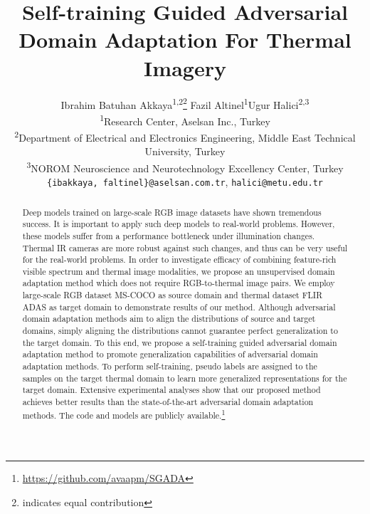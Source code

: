 \documentclass[final]{cvpr}
\begin{document}
\title{\vspace{-10mm}Self-training Guided Adversarial Domain Adaptation For Thermal Imagery}

\author{Ibrahim Batuhan Akkaya\textsuperscript{1,2}\thanks{indicates equal contribution} \qquad\qquad Fazil Altinel\textsuperscript{1}\footnotemark[1] \qquad\qquad Ugur Halici\textsuperscript{2,3}\\
\textsuperscript{1}Research Center, Aselsan Inc., Turkey\\
\textsuperscript{2}Department of Electrical and Electronics Engineering, Middle East Technical University, Turkey\\
\textsuperscript{3}NOROM Neuroscience and Neurotechnology Excellency Center, Turkey\\
{\tt\small \{ibakkaya, faltinel\}@aselsan.com.tr}, {\tt\small halici@metu.edu.tr}
}

\maketitle


\begin{abstract}
Deep models trained on large-scale RGB image datasets have shown tremendous success. It is important to apply such deep models to real-world problems. However, these models suffer from a performance bottleneck under illumination changes. Thermal IR cameras are more robust against such changes, and thus can be very useful for the real-world problems. In order to investigate efficacy of combining feature-rich visible spectrum and thermal image modalities, we propose an unsupervised domain adaptation method which does not require RGB-to-thermal image pairs. We employ large-scale RGB dataset MS-COCO as source domain and thermal dataset FLIR ADAS as target domain to demonstrate results of our method. Although adversarial domain adaptation methods aim to align the distributions of source and target domains, simply aligning the distributions cannot guarantee perfect generalization to the target domain. To this end, we propose a self-training guided adversarial domain adaptation method to promote generalization capabilities of adversarial domain adaptation methods. To perform self-training, pseudo labels are assigned to the samples on the target thermal domain to learn more generalized representations for the target domain. Extensive experimental analyses show that our proposed method achieves better results than the state-of-the-art adversarial domain adaptation methods. The code and models are publicly available.\footnote[1]{\href{https://github.com/avaapm/SGADA}{https://github.com/avaapm/SGADA}}
\end{abstract}
\end{document}
